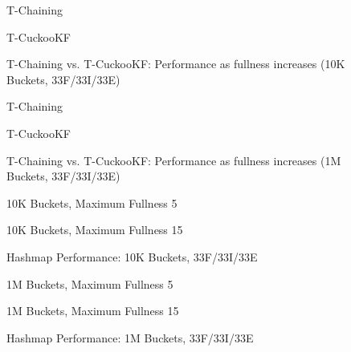 \begin{figure}[H]
    \centering
    \begin{minipage}{0.7\textwidth}
    \caption*{T-Chaining}
        \vspace{12pt}
    \end{minipage}
    \begin{minipage}{0.7\textwidth}
    \caption*{T-CuckooKF}
    \end{minipage}
    \caption{T-Chaining vs. T-CuckooKF: Performance as fullness increases (10K Buckets, 33F/33I/33E)}
    \label{fig:hm_fullness_33_1}
\end{figure}

\begin{figure}[H]
    \centering
    \begin{minipage}{0.7\textwidth}
    \caption*{T-Chaining}
        \vspace{12pt}
    \end{minipage}
    \begin{minipage}{0.7\textwidth}
    \caption*{T-CuckooKF}
    \end{minipage}
    \caption{T-Chaining vs. T-CuckooKF: Performance as fullness increases (1M Buckets, 33F/33I/33E)}
    \label{fig:hm_fullness_33_2}
\end{figure}

\begin{figure}[H]
    \centering
    \begin{minipage}{0.75\textwidth}
    \caption*{10K Buckets, Maximum Fullness 5}
        \vspace{12pt}
    \end{minipage}
   \begin{minipage}{0.75\textwidth}
    \caption*{10K Buckets, Maximum Fullness 15}
    \end{minipage}
	\caption{Hashmap Performance: 10K Buckets, 33F/33I/33E}
    \label{fig:hm_33_1}
\end{figure}

\begin{figure}[H]
    \centering
    \begin{minipage}{0.75\textwidth}
    \caption*{1M Buckets, Maximum Fullness 5}
        \vspace{12pt}
    \end{minipage}
   \begin{minipage}{0.75\textwidth}
    \caption*{1M Buckets, Maximum Fullness 15}
        \vspace{12pt}
    \end{minipage}
	\caption{Hashmap Performance: 1M Buckets, 33F/33I/33E}
    \label{fig:hm_33_3}
\end{figure}

